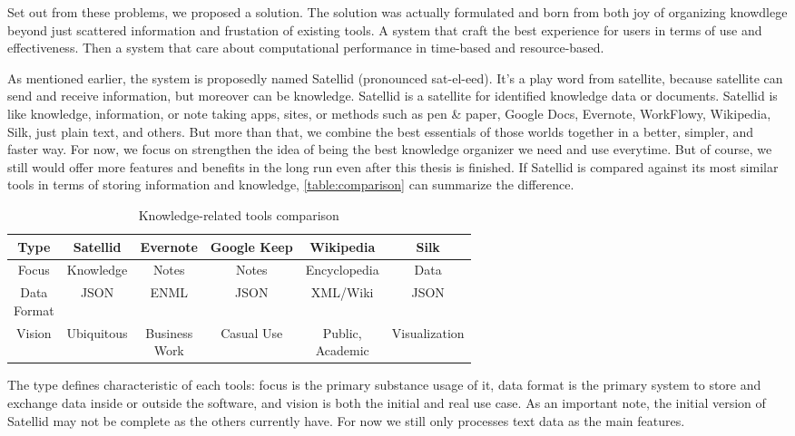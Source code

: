 Set out from these problems, we proposed a solution.
The solution was actually formulated and born from both joy of organizing knowdlege beyond just scattered information and frustation of existing tools.
A system that craft the best experience for users in terms of use and effectiveness.
Then a system that care about computational performance in time-based and resource-based.

As mentioned earlier, the system is proposedly named Satellid (pronounced sat-el-eed). It's a play word from satellite, because satellite can send and receive information, but moreover can be knowledge. Satellid is a satellite for identified knowledge data or documents.
Satellid is like knowledge, information, or note taking apps, sites, or methods such as pen \& paper, Google Docs, Evernote, WorkFlowy, Wikipedia, Silk, just plain text, and others.
But more than that, we combine the best essentials of those worlds together in a better, simpler, and faster way.
For now, we focus on strengthen the idea of being the best knowledge organizer we need and use everytime.
But of course, we still would offer more features and benefits in the long run even after this thesis is finished.
If Satellid is compared against its most similar tools in terms of storing information and knowledge, \autoref{table:comparison} can summarize the difference.

\begin{table}[h!]
\centering
\begin{tabular}{ |c||c|c|c|c|c| }
\hline
Type         & Satellid   & Evernote      & Google Keep & Wikipedia    & Silk \\ \hline
\hline
Focus        & Knowledge  & Notes         & Notes       & Encyclopedia & Data \\ \hline
\shortstack{Data\\Format} & JSON       & ENML          & JSON        & XML/Wiki     & JSON \\ \hline
Vision       & Ubiquitous & \shortstack{Business\\Work} & Casual Use  & \shortstack{Public,\\Academic} & Visualization \\
\hline
\end{tabular}
\caption{Knowledge-related tools comparison}
\label{table:comparison}
\end{table}

The type defines characteristic of each tools: focus is the primary substance usage of it, data format is the primary system to store and exchange data inside or outside the software, and vision is both the initial and real use case.
As an important note, the initial version of Satellid may not be complete as the others currently have.
For now we still only processes text data as the main features.

